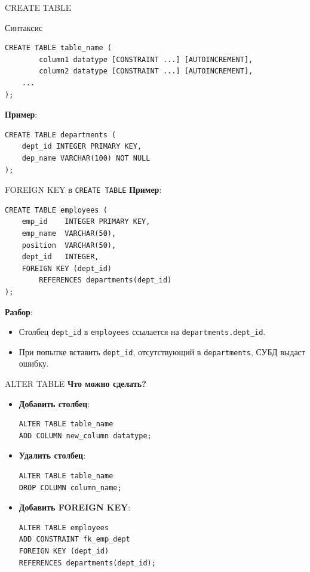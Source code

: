 \documentclass{beamer}
\begin{document}
\begin{frame}[fragile]{CREATE TABLE}
	\begin{block}{Синтаксис}
		\begin{verbatim}
CREATE TABLE table_name (
        column1 datatype [CONSTRAINT ...] [AUTOINCREMENT],
        column2 datatype [CONSTRAINT ...] [AUTOINCREMENT],
    ...
);
\end{verbatim}
	\end{block}

	\textbf{Пример}:
	\begin{verbatim}
CREATE TABLE departments (
    dept_id INTEGER PRIMARY KEY,
    dep_name VARCHAR(100) NOT NULL
);
    \end{verbatim}
\end{frame}

\begin{frame}[fragile]{FOREIGN KEY в \texttt{CREATE TABLE}}
	\textbf{Пример}:
	\begin{verbatim}
CREATE TABLE employees (
    emp_id    INTEGER PRIMARY KEY,
    emp_name  VARCHAR(50),
    position  VARCHAR(50),
    dept_id   INTEGER,
    FOREIGN KEY (dept_id)
        REFERENCES departments(dept_id)
);
    \end{verbatim}
	\textbf{Разбор}:
	\begin{itemize}
		\item Столбец \texttt{dept\_id} в \texttt{employees} ссылается на \texttt{departments.dept\_id}.
		\item При попытке вставить \texttt{dept\_id}, отсутствующий в \texttt{departments}, СУБД выдаст ошибку.
	\end{itemize}
\end{frame}

\begin{frame}[fragile]{ALTER TABLE}
	\textbf{Что можно сделать?}
	\begin{itemize}
		\item \textbf{Добавить столбец}:
		      \begin{verbatim}
ALTER TABLE table_name
ADD COLUMN new_column datatype;
\end{verbatim}

		\item \textbf{Удалить столбец}:
		      \begin{verbatim}
ALTER TABLE table_name
DROP COLUMN column_name;
\end{verbatim}

		\item \textbf{Добавить FOREIGN KEY}:
		      \begin{verbatim}
ALTER TABLE employees
ADD CONSTRAINT fk_emp_dept
FOREIGN KEY (dept_id)
REFERENCES departments(dept_id);
\end{verbatim}
	\end{itemize}
\end{frame}
\end{document}
